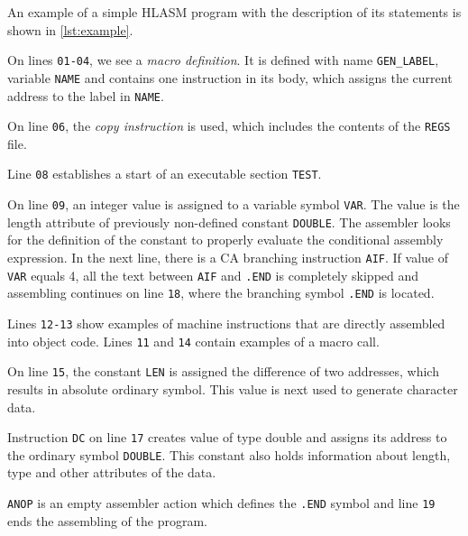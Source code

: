 \vspace{5mm}

An example of a simple HLASM program with the description of its statements is shown in \cref{lst:example}.

On lines \verb|01-04|, we see a \emph{macro definition}. It is defined with name \verb|GEN_LABEL|, variable \verb|NAME| and contains one instruction in its body, which assigns the current address to the label in \verb|NAME|.

On line \verb|06|, the \emph{copy instruction} is used, which includes the contents of the \verb|REGS| file.

Line \verb|08| establishes a start of an executable section \verb|TEST|. 

On line \verb|09|, an integer value is assigned to a variable symbol \verb|VAR|. The value is the length attribute of previously non-defined constant \verb|DOUBLE|. The assembler looks for the definition of the constant to properly evaluate the conditional assembly expression. In the next line, there is a CA branching instruction \verb|AIF|. If value of \verb|VAR| equals 4, all the text between \verb|AIF| and \verb|.END| is completely skipped and assembling continues on line \verb|18|, where the branching symbol \verb|.END| is located.

Lines \verb|12-13| show examples of machine instructions that are directly assembled into object code. Lines \verb|11| and \verb|14| contain examples of a macro call.

On line \verb|15|, the constant \verb|LEN| is assigned the difference of two addresses, which results in absolute ordinary symbol. This value is next used to generate character data.

Instruction \verb|DC| on line \verb|17| creates value of type double and assigns its address to the ordinary symbol \verb|DOUBLE|. This constant also holds information about length, type and other attributes of the data.  

\verb|ANOP| is an empty assembler action which defines the \verb|.END| symbol and line \verb|19| ends the assembling of the program. 



